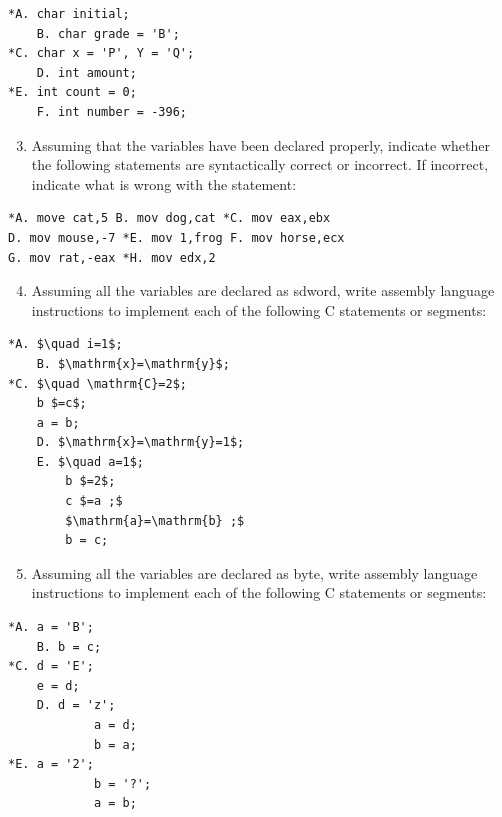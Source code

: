 \documentclass[10pt]{book}
\begin{document}
\begin{verbatim}
*A. char initial;
    B. char grade = 'B';
*C. char x = 'P', Y = 'Q';
    D. int amount;
*E. int count = 0;
    F. int number = -396;
\end{verbatim}

\begin{enumerate}
  \setcounter{enumi}{2}
  \item Assuming that the variables have been declared properly, indicate whether the following statements are syntactically correct or incorrect. If incorrect, indicate what is wrong with the statement:
\end{enumerate}

\begin{verbatim}
*A. move cat,5 B. mov dog,cat *C. mov eax,ebx
D. mov mouse,-7 *E. mov 1,frog F. mov horse,ecx
G. mov rat,-eax *H. mov edx,2
\end{verbatim}

\begin{enumerate}
  \setcounter{enumi}{3}
  \item Assuming all the variables are declared as sdword, write assembly language instructions to implement each of the following C statements or segments:
\end{enumerate}


\begin{verbatim}
*A. $\quad i=1$;
    B. $\mathrm{x}=\mathrm{y}$;
*C. $\quad \mathrm{C}=2$;
    b $=c$;
    a = b;
    D. $\mathrm{x}=\mathrm{y}=1$;
    E. $\quad a=1$;
        b $=2$;
        c $=a ;$
        $\mathrm{a}=\mathrm{b} ;$
        b = c;
\end{verbatim}

\begin{enumerate}
  \setcounter{enumi}{4}
  \item Assuming all the variables are declared as byte, write assembly language instructions to implement each of the following C statements or segments:
\end{enumerate}

\begin{verbatim}
*A. a = 'B';
    B. b = c;
*C. d = 'E';
    e = d;
    D. d = 'z';
            a = d;
            b = a;
*E. a = '2';
            b = '?';
            a = b;
\end{verbatim}
\end{document}
